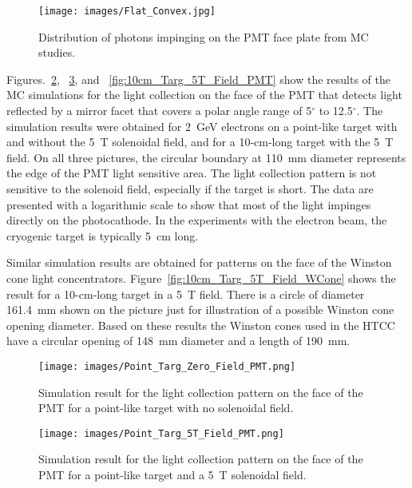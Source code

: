 \begin{figure}[!ht]
    \centering
    \texttt{[image: images/Flat\_Convex.jpg]}
    \caption{Distribution of photons impinging on the PMT face plate from MC studies.}
    \label{fig:Flat_Convex}
\end{figure}

Figures.~\ref{fig:Point_Targ_Zero_Field_PMT}, ~\ref{fig:Point_Targ_5T_Field_PMT}, and
~\ref{fig:10cm_Targ_5T_Field_PMT} show the results of the MC simulations for the light collection on the face
of the PMT that detects light reflected by a mirror facet that covers a polar angle range of 5$^\circ$ to 12.5$^\circ$.
The simulation results were obtained for 2~GeV electrons on a point-like target with and without the 5~T solenoidal
field, and for a 10-cm-long target with the 5~T field. On all three pictures, the circular boundary at 110~mm diameter
represents the edge of the PMT light sensitive area. The light collection pattern is not sensitive to the solenoid field,
especially if the target is short. The data are presented with a logarithmic scale to show that most of the light
impinges directly on the photocathode. In the experiments with the electron beam, the cryogenic target is
typically 5~cm long. 

Similar simulation results are obtained for patterns on the face of the Winston cone light concentrators.
Figure~\ref{fig:10cm_Targ_5T_Field_WCone} shows the result for a 10-cm-long target in a 5~T field. There is a
circle of diameter 161.4~mm shown on the picture just for illustration of a possible Winston cone opening diameter.
Based on these results the Winston cones used in the HTCC have a circular opening of 148~mm diameter and a
length of 190~mm. 

\begin{figure}[!ht]
    \centering
    \texttt{[image: images/Point\_Targ\_Zero\_Field\_PMT.png]}
    \caption{Simulation result for the light collection pattern on the face of the PMT for a point-like target with no
      solenoidal field.}
    \label{fig:Point_Targ_Zero_Field_PMT}
\end{figure}

\begin{figure}[!ht]
    \centering
    \texttt{[image: images/Point\_Targ\_5T\_Field\_PMT.png]}
    \caption{Simulation result for the light collection pattern on the face of the PMT for a point-like target and a 5~T
      solenoidal field.}
    \label{fig:Point_Targ_5T_Field_PMT}
\end{figure}

